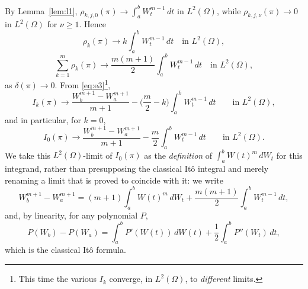 \documentclass[11pt,fleqn]{article}
\theoremstyle{plain}
\theoremstyle{remark}
\begin{document}
By Lemma~\ref{lem:l1}, $\rho_{k,j,0}(\pi)\to\int_a^bW_t^{m-1}\,dt$ in
$L^2(\Omega)$, while $\rho_{k,j,\nu}(\pi)\to0$ in $L^2(\Omega)$
for $\nu\ge1$. Hence
\[
\rho_k(\pi)\longrightarrow k\int_a^bW_t^{m-1}\,dt
\quad\text{in }L^2(\Omega),
\]
\[
\sum_{k=1}^m\rho_k(\pi)\longrightarrow\frac{m(m+1)}2\int_a^bW_t^{m-1}\,dt
\quad\text{in }L^2(\Omega),
\]
as $\delta(\pi)\to0$. From \eqref{eq:e3}\footnote{This time the various
$I_k$ converge, in $L^2(\Omega)$, to \emph{different} limits.},
\[
I_k(\pi)\longrightarrow\frac{W_b^{m+1}-W_a^{m+1}}{m+1}-\Big(\frac m2-k\Big)\int_a^bW_t^{m-1}\,dt
\qquad\text{in }L^2(\Omega),
\]
and in particular, for $k=0$,
\[
I_0(\pi)\longrightarrow\frac{W_b^{m+1}-W_a^{m+1}}{m+1}-\frac m2\int_a^bW_t^{m-1}\,dt
\qquad\text{in }L^2(\Omega).
\]
We take this $L^2(\Omega)$-limit of $I_0(\pi)$ as the \emph{definition}
of $\int_a^bW(t)^m\,dW_t$ for this integrand, rather than presupposing
the classical It\^o integral and merely renaming a limit that is proved
to coincide with it: we write
\[
W_b^{m+1}-W_a^{m+1}=(m+1)\int_a^bW(t)^m\,dW_t+\frac{m(m+1)}2\int_a^bW_t^{m-1}\,dt,
\]
and, by linearity, for any polynomial $P$,
\[
P(W_b)-P(W_a)=\int_a^bP'(W(t))\,dW(t)+\frac12\int_a^bP''(W_t)\,dt,
\]
which is the classical It\^o formula.
\end{document}
